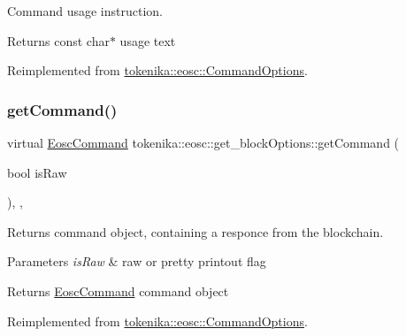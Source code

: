 Command \textquotesingle{}usage\textquotesingle{} instruction. 

\begin{DoxyReturn}{Returns}
const char$\ast$ usage text 
\end{DoxyReturn}


Reimplemented from \hyperlink{classtokenika_1_1eosc_1_1_command_options_a28fb680d7477e19e523367d2585655fb}{tokenika\+::eosc\+::\+Command\+Options}.

\mbox{\label{classtokenika_1_1eosc_1_1get__block_options_a4945270fc48d5b3cc39b1af998a39dfc}} 
\subsubsection{\texorpdfstring{get\+Command()}{getCommand()}}
{\footnotesize\ttfamily virtual \hyperlink{classtokenika_1_1eosc_1_1_eosc_command}{Eosc\+Command} tokenika\+::eosc\+::get\+\_\+block\+Options\+::get\+Command (\begin{DoxyParamCaption}\item[{bool}]{is\+Raw }\end{DoxyParamCaption})\hspace{0.3cm}{\ttfamily [inline]}, {\ttfamily [protected]}, {\ttfamily [virtual]}}



Returns command object, containing a responce from the blockchain. 


\begin{DoxyParams}{Parameters}
{\em is\+Raw} & raw or pretty printout flag \\
\hline
\end{DoxyParams}
\begin{DoxyReturn}{Returns}
\hyperlink{classtokenika_1_1eosc_1_1_eosc_command}{Eosc\+Command} command object 
\end{DoxyReturn}


Reimplemented from \hyperlink{classtokenika_1_1eosc_1_1_command_options_a787f15164e2055394d9d948c07bf201c}{tokenika\+::eosc\+::\+Command\+Options}.

\mbox{\label{classtokenika_1_1eosc_1_1get__block_options_a58257ff6c0a7413dd1c8141ffe789d91}} 
